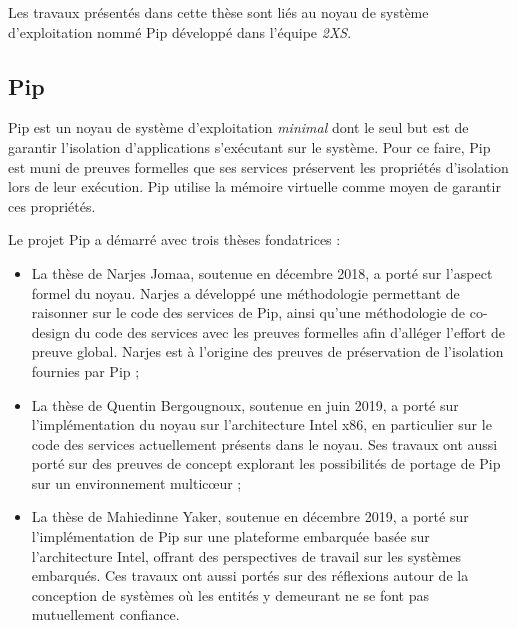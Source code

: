 Les travaux présentés dans cette thèse sont liés au noyau de système d'exploitation nommé Pip développé dans l'équipe \emph{2XS}.

\subsection{Pip}

Pip est un noyau de système d'exploitation \emph{minimal} dont le seul but est de garantir l'isolation d'applications s'exécutant sur le système. Pour ce faire, Pip est muni de preuves formelles que ses services préservent les propriétés d'isolation lors de leur exécution. Pip utilise la mémoire virtuelle comme moyen de garantir ces propriétés.

Le projet Pip a démarré avec trois thèses fondatrices :
\begin{itemize}
	\item La thèse de Narjes Jomaa, soutenue en décembre 2018, a porté sur l'aspect formel du noyau. Narjes a développé une méthodologie permettant de raisonner sur le code des services de Pip, ainsi qu'une méthodologie de co-design du code des services avec les preuves formelles afin d'alléger l'effort de preuve global. Narjes est à l'origine des preuves de préservation de l'isolation fournies par Pip ;
	\item La thèse de Quentin Bergougnoux, soutenue en juin 2019, a porté sur l'implémentation du noyau sur l'architecture Intel x86, en particulier sur le code des services actuellement présents dans le noyau. Ses travaux ont aussi porté sur des preuves de concept explorant les possibilités de portage de Pip sur un environnement multicœur ;
	\item La thèse de Mahiedinne Yaker, soutenue en décembre 2019, a porté sur l'implémentation de Pip sur une plateforme embarquée basée sur l'architecture Intel, offrant des perspectives de travail sur les systèmes embarqués. Ces travaux ont aussi portés sur des réflexions autour de la conception de systèmes où les entités y demeurant ne se font pas mutuellement confiance.
\end{itemize}


